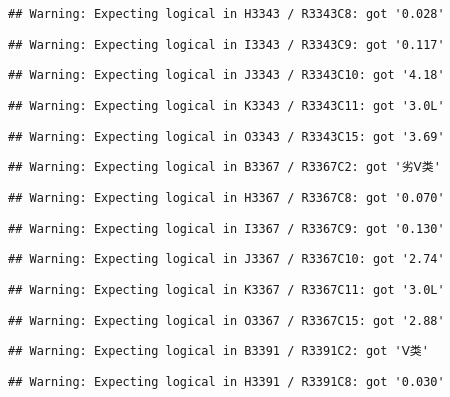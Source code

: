 \documentclass[
]{article}
\begin{document}
\begin{verbatim}
## Warning: Expecting logical in H3343 / R3343C8: got '0.028'
\end{verbatim}

\begin{verbatim}
## Warning: Expecting logical in I3343 / R3343C9: got '0.117'
\end{verbatim}

\begin{verbatim}
## Warning: Expecting logical in J3343 / R3343C10: got '4.18'
\end{verbatim}

\begin{verbatim}
## Warning: Expecting logical in K3343 / R3343C11: got '3.0L'
\end{verbatim}

\begin{verbatim}
## Warning: Expecting logical in O3343 / R3343C15: got '3.69'
\end{verbatim}

\begin{verbatim}
## Warning: Expecting logical in B3367 / R3367C2: got '劣Ⅴ类'
\end{verbatim}

\begin{verbatim}
## Warning: Expecting logical in H3367 / R3367C8: got '0.070'
\end{verbatim}

\begin{verbatim}
## Warning: Expecting logical in I3367 / R3367C9: got '0.130'
\end{verbatim}

\begin{verbatim}
## Warning: Expecting logical in J3367 / R3367C10: got '2.74'
\end{verbatim}

\begin{verbatim}
## Warning: Expecting logical in K3367 / R3367C11: got '3.0L'
\end{verbatim}

\begin{verbatim}
## Warning: Expecting logical in O3367 / R3367C15: got '2.88'
\end{verbatim}

\begin{verbatim}
## Warning: Expecting logical in B3391 / R3391C2: got 'Ⅴ类'
\end{verbatim}

\begin{verbatim}
## Warning: Expecting logical in H3391 / R3391C8: got '0.030'
\end{verbatim}
\end{document}
